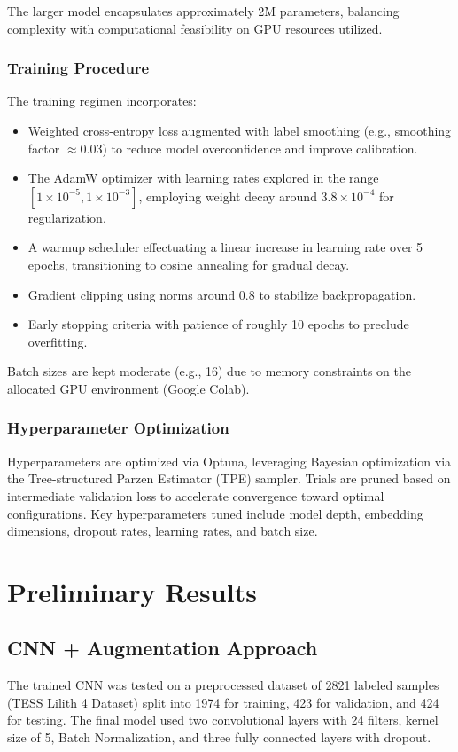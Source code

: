 \documentclass[letterpaper]{article} %
\begin{document}
The larger model encapsulates approximately 2M parameters, balancing complexity with computational feasibility on GPU resources utilized.

\subsubsection*{Training Procedure}

The training regimen incorporates:

\begin{itemize}
    \item Weighted cross-entropy loss augmented with label smoothing (e.g., smoothing factor \(\approx 0.03\)) to reduce model overconfidence and improve calibration.
    \item The AdamW optimizer with learning rates explored in the range \([1\times10^{-5}, 1\times10^{-3}]\), employing weight decay around \(3.8 \times 10^{-4}\) for regularization.
    \item A warmup scheduler effectuating a linear increase in learning rate over 5 epochs, transitioning to cosine annealing for gradual decay.
    \item Gradient clipping using norms around 0.8 to stabilize backpropagation.
    \item Early stopping criteria with patience of roughly 10 epochs to preclude overfitting.
\end{itemize}

Batch sizes are kept moderate (e.g., 16) due to memory constraints on the allocated GPU environment (Google Colab).

\subsubsection*{Hyperparameter Optimization}
Hyperparameters are optimized via Optuna, leveraging Bayesian optimization via the Tree-structured Parzen Estimator (TPE) sampler. Trials are pruned based on intermediate validation loss to accelerate convergence toward optimal configurations. Key hyperparameters tuned include model depth, embedding dimensions, dropout rates, learning rates, and batch size.

\section*{Preliminary Results}
\subsection {CNN + Augmentation Approach}
The trained CNN was tested on a preprocessed dataset of 2821 labeled samples (TESS Lilith 4 Dataset) split into 1974 for training, 423 for validation, and 424 for testing. The final model used two convolutional layers with 24 filters, kernel size of 5, Batch Normalization, and three fully connected layers with dropout.
\end{document}
